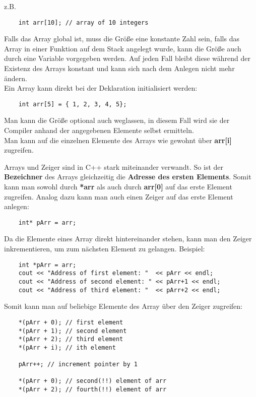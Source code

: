 z.B.
\begin{lstlisting}
	int arr[10]; // array of 10 integers
\end{lstlisting}

Falls das Array global ist, muss die Größe eine konstante Zahl sein, falls das Array in einer Funktion auf dem Stack angelegt wurde, kann die Größe auch durch eine Variable vorgegeben werden.
Auf jeden Fall bleibt diese während der Existenz des Arrays konstant und kann sich nach dem Anlegen nicht mehr ändern.\\
Ein Array kann direkt bei der Deklaration initialisiert werden:
\begin{lstlisting}
	int arr[5] = { 1, 2, 3, 4, 5};
\end{lstlisting}
Man kann die Größe optional auch weglassen, in diesem Fall wird sie der Compiler anhand der angegebenen Elemente selbst ermitteln. \\

Man kann auf die einzelnen Elemente des Arrays wie gewohnt über 
\textbf{arr[i]}
zugreifen.

Arrays und Zeiger sind in C++ stark miteinander verwandt.
So ist der \textbf{Bezeichner} des Arrays gleichzeitig die \textbf{Adresse des ersten Elements}.
Somit kann man sowohl durch \textbf{*arr} als auch durch \textbf{arr[0]} auf das erste Element zugreifen.
Analog dazu kann man auch einen Zeiger auf das erste Element anlegen:
\begin{lstlisting}
	int* pArr = arr;
\end{lstlisting}
Da die Elemente eines Array direkt hintereinander stehen, kann man den Zeiger inkrementieren, um zum  nächsten Element zu gelangen.
Beispiel:

\begin{lstlisting}
	int *pArr = arr;
	cout << "Address of first element: "  << pArr << endl;
	cout << "Address of second element: " << pArr+1 << endl;
	cout << "Address of third element: "  << pArr+2 << endl;
\end{lstlisting}

Somit kann man auf beliebige Elemente des Array über den Zeiger zugreifen:
\begin{lstlisting}
	*(pArr + 0); // first element
	*(pArr + 1); // second element
	*(pArr + 2); // third element
	*(pArr + i); // ith element
	
	pArr++; // increment pointer by 1
	
	*(pArr + 0); // second(!!) element of arr
	*(pArr + 2); // fourth(!!) element of arr
\end{lstlisting}

